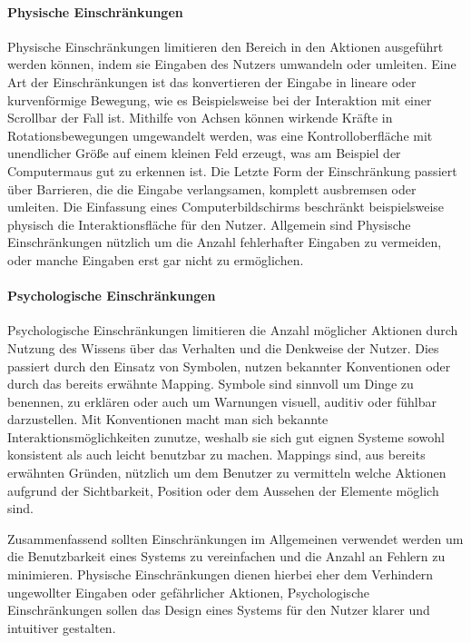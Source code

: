 \paragraph{Physische Einschränkungen}
Physische Einschränkungen limitieren den Bereich in den Aktionen ausgeführt werden können, indem sie Eingaben des Nutzers umwandeln oder umleiten.
Eine Art der Einschränkungen ist das konvertieren der Eingabe in lineare oder kurvenförmige Bewegung, wie es Beispielsweise bei der Interaktion mit einer Scrollbar der Fall ist.
Mithilfe von Achsen können wirkende Kräfte in Rotationsbewegungen umgewandelt werden, was eine Kontrolloberfläche mit unendlicher Größe auf einem kleinen Feld erzeugt, was am Beispiel der Computermaus gut zu erkennen ist.
Die Letzte Form der Einschränkung passiert über Barrieren, die die Eingabe verlangsamen, komplett ausbremsen oder umleiten. Die Einfassung eines Computerbildschirms beschränkt beispielsweise physisch die Interaktionsfläche für den Nutzer.
Allgemein sind Physische Einschränkungen nützlich um die Anzahl fehlerhafter Eingaben zu vermeiden, oder manche Eingaben erst gar nicht zu ermöglichen\cite{Norman.2016}.

\paragraph{Psychologische Einschränkungen}
Psychologische Einschränkungen limitieren die Anzahl möglicher Aktionen durch Nutzung des Wissens über das Verhalten und die Denkweise der Nutzer.
Dies passiert durch den Einsatz von Symbolen, nutzen bekannter Konventionen oder durch das bereits erwähnte Mapping.
Symbole sind sinnvoll um Dinge zu benennen, zu erklären oder auch um Warnungen visuell, auditiv oder fühlbar darzustellen.
Mit Konventionen macht man sich bekannte Interaktionsmöglichkeiten zunutze, weshalb sie sich gut eignen Systeme sowohl konsistent als auch leicht benutzbar zu machen.
Mappings sind, aus bereits erwähnten Gründen, nützlich um dem Benutzer zu vermitteln welche Aktionen aufgrund der Sichtbarkeit, Position oder dem Aussehen der Elemente möglich sind\cite{Norman.2016}.

Zusammenfassend sollten Einschränkungen im Allgemeinen verwendet werden um die Benutzbarkeit eines Systems zu vereinfachen und die Anzahl an Fehlern zu minimieren. Physische Einschränkungen dienen hierbei eher dem Verhindern ungewollter Eingaben oder gefährlicher Aktionen, Psychologische Einschränkungen sollen das Design eines Systems für den Nutzer klarer und intuitiver gestalten.

